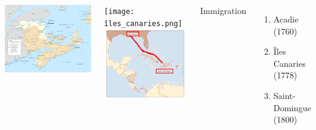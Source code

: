 \documentclass{beamer}
\begin{document}
    \begin{frame}{}
      \begin{columns}
          \begin{center}
            \includegraphics[scale=0.15]{acadie.png}
          \end{center}
          \begin{columns}
              \texttt{[image: îles\_canaries.png]}
              \includegraphics[scale=0.14]{saint-domingue.jpg}
          \end{columns}
          Immigration
          \begin{enumerate}
            \item Acadie (1760)
            \item Îles Canaries (1778)
            \item Saint-Domingue (1800)
          \end{enumerate}
      \end{columns}
    \end{frame}
\end{document}
